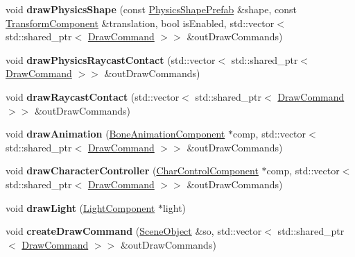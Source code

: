 \begin{Indent}
\begin{DoxyCompactItemize}
void {\bfseries draw\+Physics\+Shape} (const \mbox{\hyperlink{classrev_1_1_physics_shape_prefab}{Physics\+Shape\+Prefab}} \&shape, const \mbox{\hyperlink{classrev_1_1_transform_component}{Transform\+Component}} \&translation, bool is\+Enabled, std\+::vector$<$ std\+::shared\+\_\+ptr$<$ \mbox{\hyperlink{classrev_1_1_draw_command}{Draw\+Command}} $>$$>$ \&out\+Draw\+Commands)
\item 
\mbox{\label{classrev_1_1_debug_manager_a0d529a08564ab00ba9c92dfbfbabe6e1}} 
void {\bfseries draw\+Physics\+Raycast\+Contact} (std\+::vector$<$ std\+::shared\+\_\+ptr$<$ \mbox{\hyperlink{classrev_1_1_draw_command}{Draw\+Command}} $>$$>$ \&out\+Draw\+Commands)
\item 
\mbox{\label{classrev_1_1_debug_manager_a9053aab968cb57ef0dbe0224c92375df}} 
void {\bfseries draw\+Raycast\+Contact} (std\+::vector$<$ std\+::shared\+\_\+ptr$<$ \mbox{\hyperlink{classrev_1_1_draw_command}{Draw\+Command}} $>$$>$ \&out\+Draw\+Commands)
\item 
\mbox{\label{classrev_1_1_debug_manager_ae21628e2de41f296de1d54623d60844d}} 
void {\bfseries draw\+Animation} (\mbox{\hyperlink{classrev_1_1_bone_animation_component}{Bone\+Animation\+Component}} $\ast$comp, std\+::vector$<$ std\+::shared\+\_\+ptr$<$ \mbox{\hyperlink{classrev_1_1_draw_command}{Draw\+Command}} $>$$>$ \&out\+Draw\+Commands)
\item 
\mbox{\label{classrev_1_1_debug_manager_a52f9449dbcdb42ff6c5548db877fdb40}} 
void {\bfseries draw\+Character\+Controller} (\mbox{\hyperlink{classrev_1_1_char_control_component}{Char\+Control\+Component}} $\ast$comp, std\+::vector$<$ std\+::shared\+\_\+ptr$<$ \mbox{\hyperlink{classrev_1_1_draw_command}{Draw\+Command}} $>$$>$ \&out\+Draw\+Commands)
\item 
\mbox{\label{classrev_1_1_debug_manager_ac27787c522360fa1497a4e3f3e125970}} 
void {\bfseries draw\+Light} (\mbox{\hyperlink{classrev_1_1_light_component}{Light\+Component}} $\ast$light)
\item 
\mbox{\label{classrev_1_1_debug_manager_a0d858eae3357ff9782c06d76527aa1af}} 
void {\bfseries create\+Draw\+Command} (\mbox{\hyperlink{classrev_1_1_scene_object}{Scene\+Object}} \&so, std\+::vector$<$ std\+::shared\+\_\+ptr$<$ \mbox{\hyperlink{classrev_1_1_draw_command}{Draw\+Command}} $>$$>$ \&out\+Draw\+Commands)

\end{DoxyCompactItemize}
\end{Indent}
